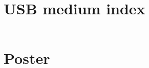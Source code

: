 \appendix
\clearpage
\chapter{USB medium index}


%

\label{app:usbIndex}
\label{listing:usbIndex}
\inputminted{text}{04_Artefakte/03_Listings/usb-index.txt}

\chapter{Poster}
\label{app:poster}
\begin{figure}[h]
    \centering
\end{figure}
%
%

